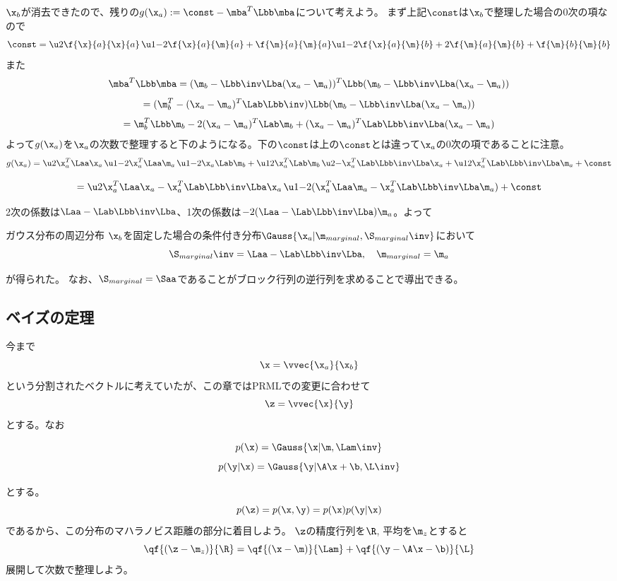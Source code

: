 \documentclass[a4paper]{jsarticle}
\begin{document}
$\x_b$が消去できたので、残りの$g(\x_a) := \const - \mba^T \Lbb \mba$について考えよう。
まず上記$\const$は$\x_b$で整理した場合の0次の項なので
\[ \const =   \u2{\f{\x}{a}{\x}{a}} \, \u1{- 2 \f{\x}{a}{\m}{a}} + \f{\m}{a}{\m}{a}
          \u1{- 2 \f{\x}{a}{\m}{b}}        + 2 \f{\m}{a}{\m}{b} +  \f{\m}{b}{\m}{b} \]
また
\[ \mba^T \Lbb \mba = (\m_b - \Lbb\inv\Lba(\x_a - \m_a))^T \Lbb (\m_b - \Lbb\inv\Lba(\x_a - \m_a))\]
\[ = (\m_b^T - (\x_a - \m_a)^T\Lab\Lbb\inv) \Lbb (\m_b - \Lbb\inv\Lba(\x_a - \m_a)) \]
\[ = \m_b^T\Lbb\m_b  -2 (\x_a - \m_a)^T \Lab \m_b + (\x_a - \m_a)^T\Lab\Lbb\inv\Lba(\x_a - \m_a) \]
よって$g(\x_a)$を$\x_a$の次数で整理すると下のようになる。下の$\const$は上の$\const$とは違って$\x_a$の0次の項であることに注意。
\[ g(\x_a) = \u2{\x_a^T \Laa \x_a} \,  \u1{- 2 \x_a^T \Laa \m_a} \,  \u1{- 2 \x_a \Lab \m_b}
+ \u1{2 \x_a^T \Lab \m_b} \, \u2{- \x_a^T \Lab\Lbb\inv\Lba \x_a} + \u1{2 \x_a^T \Lab\Lbb\inv\Lba \m_a} 
+ \const\]

\[  = \u2{   \x_a^T \Laa \x_a - \x_a^T \Lab\Lbb\inv\Lba \x_a} \, 
      \u1{-2(\x_a^T \Laa \m_a - \x_a^T \Lab\Lbb\inv\Lba \m_a)} 
+ \const\]


2次の係数は$\Laa - \Lab\Lbb\inv\Lba$、1次の係数は$-2 (\Laa - \Lab\Lbb\inv\Lba) \m_a$。よって
\begin{itembox}[l]{ガウス分布の周辺分布}
$\x_b$を固定した場合の条件付き分布$\Gauss{\x_a | \m_{marginal}, \S_{marginal}\inv}$において
\[ \S_{marginal}\inv = \Laa - \Lab\Lbb\inv\Lba, \quad \m_{marginal} = \m_a \]
\end{itembox}
が得られた。
なお、$\S_{marginal} = \Saa$であることがブロック行列の逆行列を求めることで導出できる。


\subsection{ベイズの定理}
今まで
\[ \x = \vvec{\x_a}{\x_b}\]
という分割されたベクトルに考えていたが、この章ではPRMLでの変更に合わせて
\[ \z = \vvec{\x}{\y}\]
とする。なお

\[ p(\x) = \Gauss{\x | \m, \Lam\inv }\]
\[ p(\y|\x) = \Gauss{\y | \A \x + \b, \L\inv }\]

とする。
\[ p(\z) = p(\x, \y) = p(\x) p(\y | \x) \]
であるから、この分布のマハラノビス距離の部分に着目しよう。
$\z$の精度行列を$\R$, 平均を$\m_z$とすると
\[ \qf{(\z - \m_z)}{\R} = \qf{(\x - \m)}{\Lam} + \qf{(\y - \A\x - \b)}{\L} \]
展開して次数で整理しよう。
\end{document}
